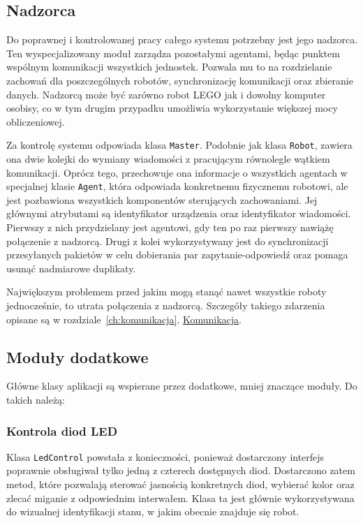 \subsection{Nadzorca}

Do poprawnej i kontrolowanej pracy całego systemu potrzebny jest jego nadzorca. Ten wyspecjalizowany moduł zarządza pozostałymi agentami, będąc punktem wspólnym komunikacji wszystkich jednostek. Pozwala mu to na rozdzielanie zachowań dla poszczególnych robotów, synchronizację komunikacji oraz zbieranie danych. Nadzorcą może być zarówno robot LEGO jak i dowolny komputer osobisy, co w tym drugim przypadku umożliwia wykorzystanie większej mocy obliczeniowej.

Za kontrolę systemu odpowiada klasa {\tt Master}. Podobnie jak klasa {\tt Robot}, zawiera ona dwie kolejki do wymiany wiadomości z pracującym równolegle wątkiem komunikacji. Oprócz tego, przechowuje ona informacje o wszystkich agentach w specjalnej klasie {\tt Agent}, która odpowiada konkretnemu fizycznemu robotowi, ale jest pozbawiona wszystkich komponentów sterujących zachowaniami. Jej głównymi atrybutami są identyfikator urządzenia oraz identyfikator wiadomości. Pierwszy z nich przydzielany jest agentowi, gdy ten po raz pierwszy nawiążę połączenie z nadzorcą. Drugi z kolei wykorzystywany jest do synchronizacji przesyłanych pakietów w celu dobierania par zapytanie-odpowiedź oraz pomaga usunąć nadmiarowe duplikaty.

Największym problemem przed jakim mogą stanąć nawet wszystkie roboty jednocześnie, to utrata połączenia z nadzorcą. Szczegóły takiego zdarzenia opisane są w rozdziale~\ref{ch:komunikacja}. \hyperref[ch:komunikacja]{Komunikacja}.

\subsection{Moduły dodatkowe}

Główne klasy aplikacji są wspierane przez dodatkowe, mniej znaczące moduły. Do takich należą:

\subsubsection{Kontrola diod LED}

Klasa {\tt LedControl} powstała z konieczności, ponieważ dostarczony interfejs poprawnie obsługiwał tylko jedną z czterech dostępnych diod. Dostarczono zatem metod, które pozwalają sterować jasnością konkretnych diod, wybierać kolor oraz zlecać miganie z odpowiednim interwałem. Klasa ta jest głównie wykorzystywana do wizualnej identyfikacji stanu, w jakim obecnie znajduje się robot.

